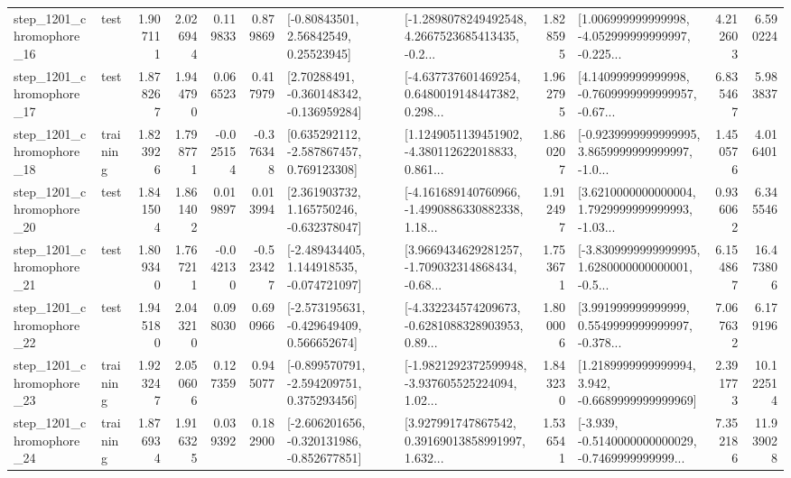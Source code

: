 \begin{tabular}{llrrrrllrlrr}
 step\_1201\_chromophore\_16 &      test &      1.907111 &    2.026944 &      0.119833 &  0.879869 &       [-0.80843501, 2.56842549, 0.25523945] &  [-1.2898078249492548, 4.2667523685413435, -0.2... &       1.828595 &  [1.006999999999998, -4.052999999999997, -0.225... &            4.212603 &          6.590224 \\
 step\_1201\_chromophore\_17 &      test &      1.878267 &    1.944790 &      0.066523 &  0.417979 &    [2.70288491, -0.360148342, -0.136959284] &  [-4.637737601469254, 0.6480019148447382, 0.298... &       1.962795 &  [4.140999999999998, -0.7609999999999957, -0.67... &            6.835467 &          5.983837 \\
 step\_1201\_chromophore\_18 &  training &      1.823926 &    1.798771 &     -0.025154 & -0.376348 &    [0.635292112, -2.587867457, 0.769123308] &  [1.1249051139451902, -4.380112622018833, 0.861... &       1.860207 &  [-0.9239999999999995, 3.8659999999999997, -1.0... &            1.450576 &          4.016401 \\
 step\_1201\_chromophore\_20 &      test &      1.841504 &    1.861402 &      0.019897 &  0.013994 &    [2.361903732, 1.165750246, -0.632378047] &  [-4.161689140760966, -1.4990886330882338, 1.18... &       1.912497 &  [3.6210000000000004, 1.7929999999999993, -1.03... &            0.936062 &          6.345546 \\
 step\_1201\_chromophore\_21 &      test &      1.809340 &    1.767211 &     -0.042130 & -0.523427 &   [-2.489434405, 1.144918535, -0.074721097] &  [3.9669434629281257, -1.709032314868434, -0.68... &       1.753671 &  [-3.8309999999999995, 1.6280000000000001, -0.5... &            6.154867 &         16.473806 \\
 step\_1201\_chromophore\_22 &      test &      1.945180 &    2.043210 &      0.098030 &  0.690966 &   [-2.573195631, -0.429649409, 0.566652674] &  [-4.332234574209673, -0.6281088328903953, 0.89... &       1.800006 &  [3.991999999999999, 0.5549999999999997, -0.378... &            7.067632 &          6.179196 \\
 step\_1201\_chromophore\_23 &  training &      1.923247 &    2.050606 &      0.127359 &  0.945077 &   [-0.899570791, -2.594209751, 0.375293456] &  [-1.9821292372599948, -3.937605525224094, 1.02... &       1.843230 &   [1.2189999999999994, 3.942, -0.6689999999999969] &            2.391773 &         10.122514 \\
 step\_1201\_chromophore\_24 &  training &      1.876934 &    1.916325 &      0.039392 &  0.182900 &  [-2.606201656, -0.320131986, -0.852677851] &  [3.927991747867542, 0.39169013858991997, 1.632... &       1.536541 &  [-3.939, -0.5140000000000029, -0.7469999999999... &            7.352186 &         11.939028 \\

\end{tabular}
